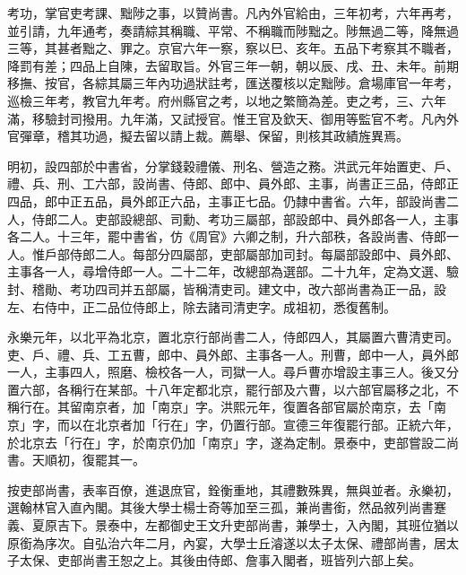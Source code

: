 考功，掌官吏考課、黜陟之事，以贊尚書。凡內外官給由，三年初考，六年再考，並引請，九年通考，奏請綜其稱職、平常、不稱職而陟黜之。陟無過二等，降無過三等，其甚者黜之、罪之。京官六年一察，察以巳、亥年。五品下考察其不職者，降罰有差；四品上自陳，去留取旨。外官三年一朝，朝以辰、戌、丑、未年。前期移撫、按官，各綜其屬三年內功過狀註考，匯送覆核以定黜陟。倉場庫官一年考，巡檢三年考，教官九年考。府州縣官之考，以地之繁簡為差。吏之考，三、六年滿，移驗封司撥用。九年滿，又試授官。惟王官及欽天、御用等監官不考。凡內外官彈章，稽其功過，擬去留以請上裁。薦舉、保留，則核其政績旌異焉。

明初，設四部於中書省，分掌錢穀禮儀、刑名、營造之務。洪武元年始置吏、戶、禮、兵、刑、工六部，設尚書、侍郎、郎中、員外郎、主事，尚書正三品，侍郎正四品，郎中正五品，員外郎正六品，主事正七品。仍隸中書省。六年，部設尚書二人，侍郎二人。吏部設總部、司勳、考功三屬部，部設郎中、員外郎各一人，主事各二人。十三年，罷中書省，仿《周官》六卿之制，升六部秩，各設尚書、侍郎一人。惟戶部侍郎二人。每部分四屬部，吏部屬部加司封。每屬部設郎中、員外郎、主事各一人，尋增侍郎一人。二十二年，改總部為選部。二十九年，定為文選、驗封、稽勛、考功四司并五部屬，皆稱清吏司。建文中，改六部尚書為正一品，設左、右侍中，正二品位侍郎上，除去諸司清吏字。成祖初，悉復舊制。

永樂元年，以北平為北京，置北京行部尚書二人，侍郎四人，其屬置六曹清吏司。吏、戶、禮、兵、工五曹，郎中、員外郎、主事各一人。刑曹，郎中一人，員外郎一人，主事四人，照磨、檢校各一人，司獄一人。尋戶曹亦增設主事三人。後又分置六部，各稱行在某部。十八年定都北京，罷行部及六曹，以六部官屬移之北，不稱行在。其留南京者，加「南京」字。洪熙元年，復置各部官屬於南京，去「南京」字，而以在北京者加「行在」字，仍置行部。宣德三年復罷行部。正統六年，於北京去「行在」字，於南京仍加「南京」字，遂為定制。景泰中，吏部嘗設二尚書。天順初，復罷其一。

按吏部尚書，表率百僚，進退庶官，銓衡重地，其禮數殊異，無與並者。永樂初，選翰林官入直內閣。其後大學士楊士奇等加至三孤，兼尚書銜，然品敘列尚書蹇義、夏原吉下。景泰中，左都御史王文升吏部尚書，兼學士，入內閣，其班位猶以原銜為序次。自弘治六年二月，內宴，大學士丘濬遂以太子太保、禮部尚書，居太子太保、吏部尚書王恕之上。其後由侍郎、詹事入閣者，班皆列六部上矣。

